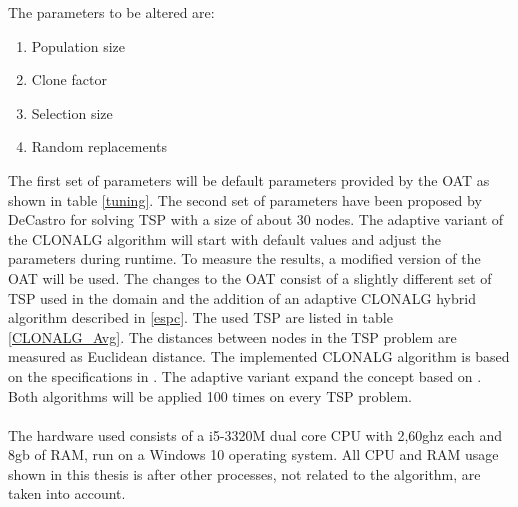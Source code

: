 The parameters to be altered are:
\begin{enumerate}
	\item 	Population size
	\item 	Clone factor
	\item 	Selection size
	\item 	Random replacements	
\end{enumerate}
The first set of parameters will be default parameters provided by the OAT as shown in table \ref{tuning}. The second set of parameters have been proposed by DeCastro \cite{DEC02} for solving TSP with a size of about 30 nodes.
The adaptive variant of the CLONALG algorithm will start with default values and adjust the parameters during runtime.
To measure the results, a modified version of the OAT will be used. The changes to the OAT consist of a slightly different set of TSP used in the domain and the addition of an adaptive CLONALG hybrid algorithm described in \ref{espc}. The used TSP are listed in table \ref{CLONALG_Avg}. The distances between nodes in the TSP problem are measured as Euclidean distance. The implemented CLONALG algorithm is based on the specifications in \cite{DEC02}. The adaptive variant expand the concept based on \cite{Garret04}.
Both algorithms will be applied 100 times on every TSP problem.\\\\
The hardware used consists of a i5-3320M dual core CPU with 2,60ghz each and 8gb of RAM, run on a Windows 10 operating system. All CPU and RAM usage shown in this thesis is after other processes, not related to the algorithm, are taken into account.
